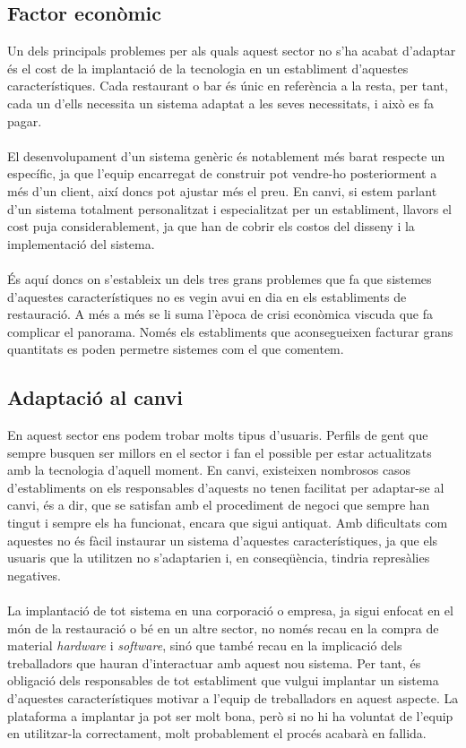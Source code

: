 \subsection{Factor econòmic}

Un dels principals problemes per als quals aquest sector no s'ha acabat d'adaptar és el cost de la implantació de la tecnologia en un establiment d'aquestes característiques. Cada restaurant o bar és únic en referència a la resta, per tant, cada un d'ells necessita un sistema adaptat a les seves necessitats, i això es fa pagar.
\\\\
El desenvolupament d'un sistema genèric és notablement més barat respecte un específic, ja que l'equip encarregat de construir pot vendre-ho posteriorment a més d'un client, així doncs pot ajustar més el preu. En canvi, si estem parlant d'un sistema totalment personalitzat i especialitzat per un establiment, llavors el cost puja considerablement, ja que han de cobrir els costos del disseny i la implementació del sistema.
\\\\
És aquí doncs on s'estableix un dels tres grans problemes que fa que sistemes d'aquestes característiques no es vegin avui en dia en els establiments de restauració. A més a més se li suma l'època de crisi econòmica viscuda que fa complicar el panorama. Només els establiments que aconsegueixen facturar grans quantitats es poden permetre sistemes com el que comentem.

\subsection{Adaptació al canvi}

En aquest sector ens podem trobar molts tipus d'usuaris. Perfils de gent que sempre busquen ser millors en el sector i fan el possible per estar actualitzats amb la tecnologia d'aquell moment. 
En canvi, existeixen nombrosos casos d'establiments on els responsables d'aquests no tenen facilitat per adaptar-se al canvi, és a dir, que se satisfan amb el procediment de negoci que sempre han tingut i sempre els ha funcionat, encara que sigui antiquat. Amb dificultats com aquestes no és fàcil instaurar un sistema d'aquestes característiques, ja que els usuaris que la utilitzen no s'adaptarien i, en conseqüència, tindria represàlies negatives.
\\\\
La implantació de tot sistema en una corporació o empresa, ja sigui enfocat en el món de la restauració o bé en un altre sector, no només recau en la compra de material \textit{hardware} i \textit{software}, sinó que també recau en la implicació dels treballadors que hauran d'interactuar amb aquest nou sistema. Per tant, és obligació dels responsables de tot establiment que vulgui implantar un sistema d'aquestes característiques motivar a l'equip de treballadors en aquest aspecte. La plataforma a implantar ja pot ser molt bona, però si no hi ha voluntat de l'equip en utilitzar-la correctament, molt probablement el procés acabarà en fallida. 

